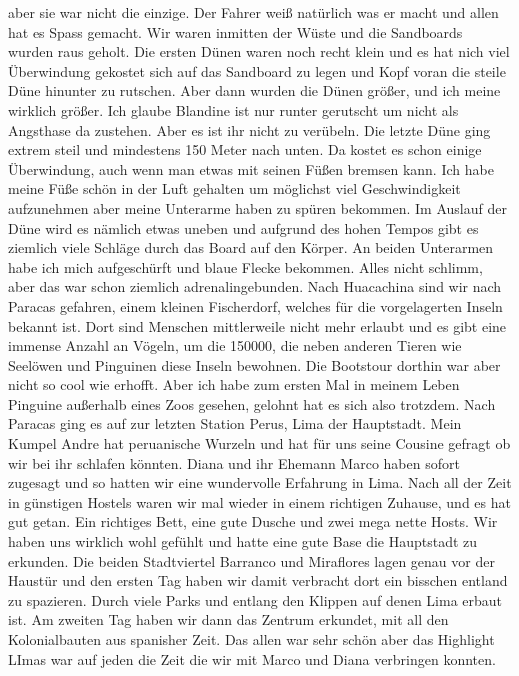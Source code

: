 \documentclass[11pt]{book}
\begin{document}
aber sie war nicht die einzige. Der Fahrer weiß natürlich was er macht und allen hat es Spass gemacht. Wir waren inmitten der Wüste und die Sandboards wurden 
raus geholt. Die ersten Dünen waren noch recht klein und es hat nich viel Überwindung gekostet sich auf das Sandboard zu legen und Kopf voran die 
steile Düne hinunter zu rutschen. Aber dann wurden die Dünen größer, und ich meine wirklich größer. Ich glaube Blandine ist nur runter gerutscht um nicht 
als Angsthase da zustehen. Aber es ist ihr nicht zu verübeln. Die letzte Düne ging extrem steil und mindestens 150 Meter nach unten. Da kostet es schon 
einige Überwindung, auch wenn man etwas mit seinen Füßen bremsen kann. Ich habe meine Füße schön in der Luft gehalten um möglichst viel Geschwindigkeit 
aufzunehmen aber meine Unterarme haben zu spüren bekommen. Im Auslauf der Düne wird es nämlich etwas uneben und aufgrund des hohen Tempos gibt es 
ziemlich viele Schläge durch das Board auf den Körper. An beiden Unterarmen habe ich mich aufgeschürft und blaue Flecke bekommen. Alles nicht schlimm, 
aber das war schon ziemlich adrenalingebunden. Nach Huacachina sind wir nach Paracas gefahren, einem kleinen Fischerdorf, welches für die vorgelagerten 
Inseln bekannt ist. Dort sind Menschen mittlerweile nicht mehr erlaubt und es gibt eine immense Anzahl an Vögeln, um die 150000, die neben anderen Tieren 
wie Seelöwen und Pinguinen diese Inseln bewohnen. Die Bootstour dorthin war aber nicht so cool wie erhofft. Aber ich habe zum ersten Mal in meinem Leben 
Pinguine außerhalb eines Zoos gesehen, gelohnt hat es sich also trotzdem. 
Nach Paracas ging es auf zur letzten Station Perus, Lima der Hauptstadt. Mein Kumpel Andre hat peruanische Wurzeln und hat für uns seine Cousine 
gefragt ob wir bei ihr schlafen könnten. Diana und ihr Ehemann Marco haben sofort zugesagt und so hatten wir eine wundervolle Erfahrung in Lima. Nach 
all der Zeit in günstigen Hostels waren wir mal wieder in einem richtigen Zuhause, und es hat gut getan. Ein richtiges Bett, eine gute Dusche und 
zwei mega nette Hosts. Wir haben uns wirklich wohl gefühlt und hatte eine gute Base die Hauptstadt zu erkunden. Die beiden Stadtviertel Barranco und 
Miraflores lagen genau vor der Haustür und den ersten Tag haben wir damit verbracht dort ein bisschen entland zu spazieren. Durch viele Parks und entlang 
den Klippen auf denen Lima erbaut ist. Am zweiten Tag haben wir dann das Zentrum erkundet, mit all den Kolonialbauten aus spanisher Zeit. Das allen 
war sehr schön aber das Highlight LImas war auf jeden die Zeit die wir mit Marco und Diana verbringen konnten. 
\end{document}
